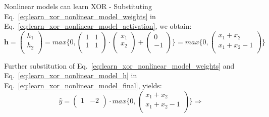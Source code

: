 \begin{frame}[t,allowframebreaks]{Nonlinear models can learn XOR -}
    Substituting Eq.~\ref{eq:learn_xor_nonlinear_model_weights} in 
    Eq.~\ref{eq:learn_xor_nonlinear_model_activation}, we obtain:
    \begin{equation}
        \mathbf{h} = 
        \begin{pmatrix}
            h_1 \\ 
            h_2 \\
        \end{pmatrix} =
        max \Bigg\{0, 
        \begin{pmatrix}
            1 & 1 \\
            1 & 1 \\
        \end{pmatrix} 
        \cdot
        \begin{pmatrix}
            x_1 \\
            x_2 \\
        \end{pmatrix}
        +         
        \begin{pmatrix}
            0 \\
            -1 \\
        \end{pmatrix}
        \Bigg\} =
        max \Bigg\{0, 
        \begin{pmatrix}
          x_1+x_2     \\ 
          x_1+x_2-1   \\
        \end{pmatrix}
        \Bigg\}
        \label{eq:learn_xor_nonlinear_model_h} 
    \end{equation}

    \framebreak

    Further substitution of 
    Eq.~\ref{eq:learn_xor_nonlinear_model_weights} and
    Eq.~\ref{eq:learn_xor_nonlinear_model_h} in
    Eq.~\ref{eq:learn_xor_nonlinear_model_final}, yields:
    \begin{equation*}
        \hat{y} = 
        \begin{pmatrix}
            1  & -2 \\
        \end{pmatrix} 
        \cdot
        max \Bigg\{0, 
        \begin{pmatrix}
          x_1+x_2     \\ 
          x_1+x_2-1   \\
        \end{pmatrix}
        \Bigg\} \Rightarrow
    \end{equation*}        


\end{frame}
